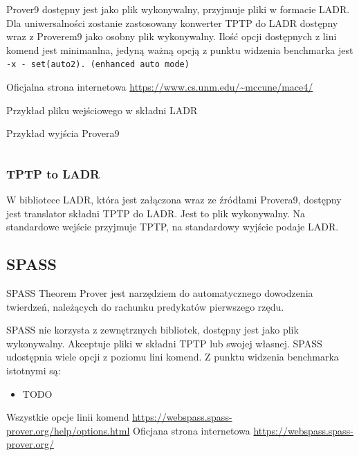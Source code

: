 \documentclass[a4paper,12pt]{article}
\newenvironment{longlisting}{\captionsetup{type=listing}}{}
\begin{document}
Prover9 dostępny jest jako plik wykonywalny, przyjmuje pliki w formacie \gls{LADR}. Dla uniwersalności zostanie zastosowany konwerter TPTP do LADR dostępny wraz z Proverem9 jako osobny plik wykonywalny. Ilość opcji dostępnych z lini komend jest minimanlna, jedyną ważną opcją z punktu widzenia benchmarka jest \texttt{-x - set(auto2).  (enhanced auto mode)}

\noindent
Oficjalna strona internetowa \url{https://www.cs.unm.edu/~mccune/mace4/}

\begin{longlisting}
  \caption{Przykład pliku wejściowego w składni LADR}
\end{longlisting}

\begin{longlisting}
  \caption{Przykład wyjścia Provera9}
  \inputminted{text}{listings/prover9_example.out}
\end{longlisting}

\subsubsection{TPTP to LADR}

W bibliotece \gls{LADR}, która jest załączona wraz ze źródłami Provera9, dostępny jest translator składni TPTP do LADR. Jest to plik wykonywalny. Na standardowe wejście przyjmuje TPTP, na standardowy wyjście podaje LADR.

\subsection{SPASS}

SPASS Theorem Prover jest narzędziem do automatycznego dowodzenia twierdzeń, należących do rachunku predykatów pierwszego rzędu.

SPASS nie korzysta z zewnętrznych bibliotek, dostępny jest jako plik wykonywalny. Akceptuje pliki w składni TPTP lub swojej własnej. SPASS udostępnia wiele opcji z poziomu lini komend. Z punktu widzenia benchmarka istotnymi są:

\begin{itemize}
  \item TODO
\end{itemize}

\noindent
Wszystkie opcje linii komend \url{https://webspass.spass-prover.org/help/options.html}
\noindent \newline
Oficjana strona internetowa \url{https://webspass.spass-prover.org/}
\end{document}
